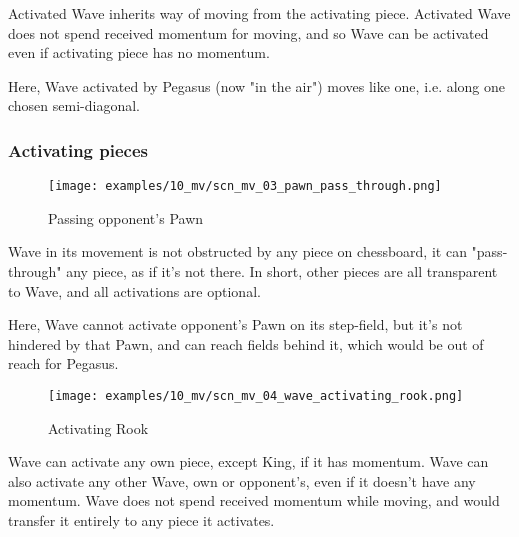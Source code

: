 Activated Wave inherits way of moving from the activating piece. Activated Wave
does not spend received momentum for moving, and so Wave can be activated even if
activating piece has no momentum.

Here, Wave activated by Pegasus (now "in the air") moves like one, i.e. along one
chosen semi-diagonal.

\clearpage %

\subsubsection*{Activating pieces}
\label{sec:Miranda's veil/Wave/Activation/Activating pieces}

\vspace*{-1.5\baselineskip}
\noindent
\begin{figure}[!h]
\texttt{[image: examples/10\_mv/scn\_mv\_03\_pawn\_pass\_through.png]}
\vspace*{-1.4\baselineskip}
\caption{Passing opponent's Pawn}
\label{fig:scn_mv_03_pawn_pass_through}
\end{figure}

\vspace*{-0.5\baselineskip}
Wave in its movement is not obstructed by any piece on chessboard, it can
"pass-through" any piece, as if it's not there. In short, other pieces are
all transparent to Wave, and all activations are optional.

Here, Wave cannot activate opponent's Pawn on its step-field, but it's not
hindered by that Pawn, and can reach fields behind it, which would be out of
reach for Pegasus.

\clearpage %

\vspace*{-2.1\baselineskip}
\noindent
\begin{figure}[!h]
\texttt{[image: examples/10\_mv/scn\_mv\_04\_wave\_activating\_rook.png]}
\vspace*{-1.3\baselineskip}
\caption{Activating Rook}
\label{fig:scn_mv_04_wave_activating_rook}
\end{figure}

\vspace*{-0.3\baselineskip}
Wave can activate any own piece, except King, if it has momentum. Wave can also
activate any other Wave, own or opponent's, even if it doesn't have any momentum.
Wave does not spend received momentum while moving, and would transfer it entirely
to any piece it activates.

